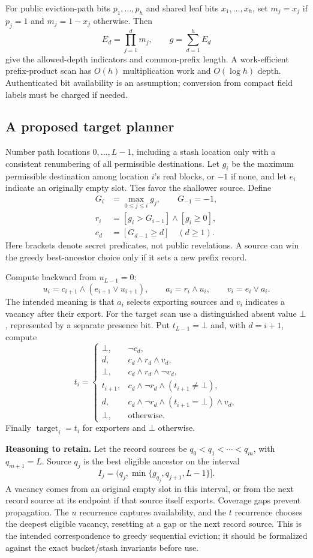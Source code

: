 \documentclass[11pt]{article}
\begin{document}
For public eviction-path bits $p_1,\ldots,p_h$ and shared leaf bits
$x_1,\ldots,x_h$, set $m_j=x_j$ if $p_j=1$ and $m_j=1-x_j$ otherwise. Then
\[
E_d=\prod_{j=1}^d m_j,\qquad g=\sum_{d=1}^h E_d
\]
give the allowed-depth indicators and common-prefix length. A work-efficient
prefix-product scan has $O(h)$ multiplication work and $O(\log h)$ depth.
Authenticated bit availability is an assumption; conversion from compact field
labels must be charged if needed.

\subsection{A proposed target planner}

Number path locations $0,\ldots,L-1$, including a stash location only with a
consistent renumbering of all permissible destinations. Let $g_i$ be the maximum
permissible destination among location $i$'s real blocks, or $-1$ if none, and
let $e_i$ indicate an originally empty slot. Ties favor the shallower source.
Define
\begin{align*}
G_i&=\max_{0\leq j\leq i}g_j,\qquad G_{-1}=-1,\\
r_i&=[g_i>G_{i-1}]\land[g_i\geq0],\\
c_d&=[G_{d-1}\geq d]\quad(d\geq1).
\end{align*}
Here brackets denote secret predicates, not public revelations. A source can
win the greedy best-ancestor choice only if it sets a new prefix record.

Compute backward from $u_{L-1}=0$:
\[
u_i=c_{i+1}\land(e_{i+1}\lor u_{i+1}),\qquad
a_i=r_i\land u_i,\qquad v_i=e_i\lor a_i.
\]
The intended meaning is that $a_i$ selects exporting sources and $v_i$ indicates
a vacancy after their export. For the target scan use a distinguished absent
value $\bot$, represented by a separate presence bit. Put $t_{L-1}=\bot$ and,
with $d=i+1$, compute
\[
t_i=\begin{cases}
\bot,&\neg c_d,\\
d,&c_d\land r_d\land v_d,\\
\bot,&c_d\land r_d\land\neg v_d,\\
t_{i+1},&c_d\land\neg r_d\land(t_{i+1}\ne\bot),\\
d,&c_d\land\neg r_d\land(t_{i+1}=\bot)\land v_d,\\
\bot,&\text{otherwise}.
\end{cases}
\]
Finally $\operatorname{target}_i=t_i$ for exporters and $\bot$ otherwise.

\textbf{Reasoning to retain.} Let the record sources be
$q_0<q_1<\cdots<q_m$, with $q_{m+1}=L$. Source $q_j$ is the best eligible
ancestor on the interval
\[
I_j=(q_j,\min\{g_{q_j},q_{j+1},L-1\}].
\]
A vacancy comes from an original empty slot in this interval, or from the next
record source at its endpoint if that source itself exports. Coverage gaps
prevent propagation. The $u$ recurrence captures availability, and the $t$
recurrence chooses the deepest eligible vacancy, resetting at a gap or the next
record source. This is the intended correspondence to greedy sequential eviction;
it should be formalized against the exact bucket/stash invariants before use.
\end{document}

